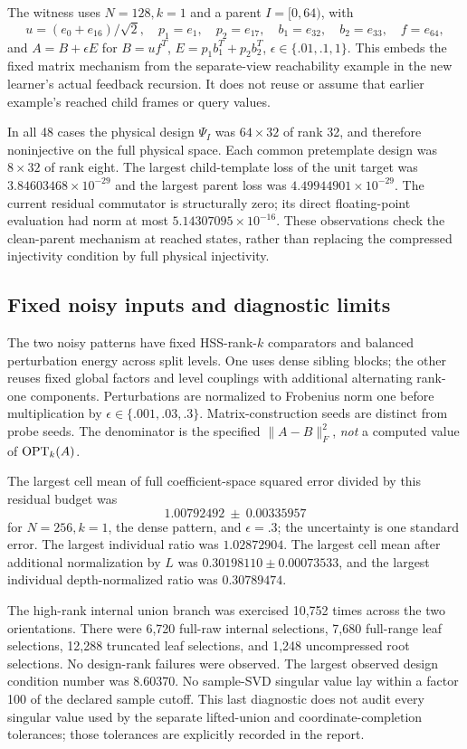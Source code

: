 \documentclass[11pt,oneside,openany,a4paper]{report}
\numberwithin{equation}{chapter}
\theoremstyle{definition}
\theoremstyle{remark}
\begin{document}
The witness uses $N=128,k=1$ and a parent $I=[0,64)$, with
\[
 u=(e_0+e_{16})/\sqrt2,\quad p_1=e_1,\quad p_2=e_{17},
 \quad b_1=e_{32},\quad b_2=e_{33},\quad f=e_{64},
\]
and $A=B+\epsilon E$ for
$B=uf^T$, $E=p_1b_1^T+p_2b_2^T$,
$\epsilon\in\{.01,.1,1\}$.  This embeds the fixed matrix mechanism
from the separate-view reachability example in the new learner's
actual feedback recursion.  It does not reuse or assume that earlier
example's reached child frames or query values.

In all 48 cases the physical design $\Psi_I$ was $64\times32$ of rank
32, and therefore noninjective on the full physical space.  Each common
pretemplate design was $8\times32$ of rank eight.  The largest
child-template loss of the unit target was
$3.84603468\times10^{-29}$ and the largest parent loss was
$4.49944901\times10^{-29}$.  The current residual commutator is
structurally zero; its direct floating-point evaluation had norm at
most $5.14307095\times10^{-16}$.  These observations check the
clean-parent mechanism at reached states, rather than replacing the
compressed injectivity condition by full physical injectivity.

\subsection{Fixed noisy inputs and diagnostic limits}

The two noisy patterns have fixed HSS-rank-$k$ comparators and balanced
perturbation energy across split levels.  One uses dense sibling
blocks; the other reuses fixed global factors and level couplings with
additional alternating rank-one components.  Perturbations are
normalized to Frobenius norm one before multiplication by
$\epsilon\in\{.001,.03,.3\}$.  Matrix-construction seeds are distinct
from probe seeds.  The denominator is the specified
$\lVert A-B\rVert_F^2$, \emph{not} a computed value of $\operatorname{OPT}_k(A)$.

The largest cell mean of full coefficient-space squared error divided
by this residual budget was
\[
 1.00792492\ \pm\ 0.00335957
\]
for $N=256,k=1$, the dense pattern, and $\epsilon=.3$; the uncertainty
is one standard error.  The largest individual ratio was
$1.02872904$.  The largest cell mean after additional normalization by
$L$ was $0.30198110\pm0.00073533$, and the largest individual
depth-normalized ratio was $0.30789474$.

The high-rank internal union branch was exercised 10,752 times across
the two orientations.  There were 6,720 full-raw internal selections,
7,680 full-range leaf selections, 12,288 truncated leaf selections,
and 1,248 uncompressed root selections.  No design-rank failures were
observed.  The largest observed design condition number was 8.60370.
No sample-SVD singular value lay within a factor 100 of the declared
sample cutoff.  This last diagnostic does not audit every singular
value used by the separate lifted-union and coordinate-completion
tolerances; those tolerances are explicitly recorded in the report.
\end{document}
